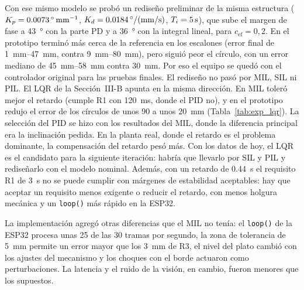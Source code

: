 Con ese mismo modelo se probó un rediseño preliminar de la misma estructura
($K_p = \SI{0.0073}{\degree\per\milli\metre}$, $K_d = \SI{0.0184}{\degree\per(\milli\metre\per\second)}$,
$T_i = \SI{5}{\second}$), que sube el margen de fase a \SI{43}{\degree} con la parte PD y a
\SI{36}{\degree} con la integral lineal, para $c_{\mathrm{ef}} = 0{,}2$. En el prototipo terminó
más cerca de la referencia en los escalones (error final de \SIrange{1}{47}{\milli\metre}, contra
\SIrange{9}{80}{\milli\metre}), pero siguió peor el círculo, con un error mediano de
\SIrange{45}{58}{\milli\metre} contra \SI{30}{\milli\metre}. Por eso el equipo se quedó con el
controlador original para las pruebas finales. El rediseño no pasó por MIL, SIL ni PIL. El LQR de
la Sección~III-B apunta en la misma dirección. En MIL toleró mejor el retardo (cumple R1 con
\SI{120}{\milli\second}, donde el PID no), y en el prototipo redujo el error de los círculos de
unos \SI{90}{} a unos \SI{20}{\milli\metre} (Tabla~\ref{tab:exp_lqr}). La selección del PID se
hizo con los resultados del MIL, donde la diferencia principal era la inclinación pedida. En la
planta real, donde el retardo es el problema dominante, la compensación del retardo pesó más.
Con los datos de hoy, el LQR es el candidato para la siguiente iteración: habría que llevarlo por
SIL y PIL y rediseñarlo con el modelo nominal. Además,
con un retardo de \SI{0.44}{\second} el requisito R1 de \SI{3}{\second} no se puede cumplir con márgenes
de estabilidad aceptables: hay que aceptar un requisito menos exigente o reducir el retardo, con menos
holgura mecánica y un \texttt{loop()} más rápido en la ESP32.

La implementación agregó otras diferencias que el MIL no tenía: el \texttt{loop()} de la ESP32
procesa unas \num{25} de las \num{30} tramas por segundo, la zona de tolerancia de
\SI{5}{\milli\metre} permite un error mayor que los \SI{3}{\milli\metre} de R3, el nivel del plato
cambió con los ajustes del mecanismo y los choques con el borde actuaron como perturbaciones. La
latencia y el ruido de la visión, en cambio, fueron menores que los supuestos.
